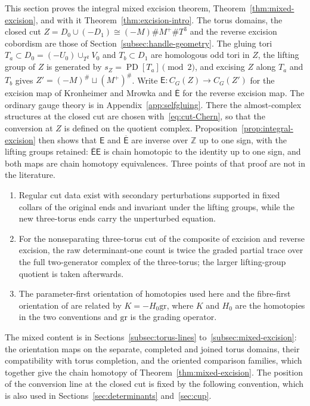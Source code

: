 \documentclass[11pt]{amsart}
\theoremstyle{definition}
\theoremstyle{remark}
\theoremstyle{plain}
\numberwithin{equation}{section}
\newcommand{\ZZ}{\mathbb Z}
\newcommand{\eps}{\mathrm{gr}}
\newcommand{\PD}{\operatorname{PD}}
\begin{document}
This section proves the integral mixed excision theorem,
Theorem~\ref{thm:mixed-excision}, and with it
Theorem~\ref{thm:excision-intro}. The torus domains, the closed cut
$Z=D_0\cup(-D_1)\cong(-M)\#M^+\#T^3$ and the reverse excision cobordism
are those of Section~\ref{subsec:handle-geometry}. The gluing tori $T_a\subset D_0=(-U_0)\cup_{T^2}V_0$ and $T_b\subset D_1$ are homologous odd tori in $Z$, the lifting group of $Z$ is generated
by $s_Z=\PD[T_a]\pmod2$, and excising $Z$ along $T_a$ and $T_b$ gives
$Z'=(-M)^\#\sqcup(M^+)^\#$. Write
$\mathsf E:C_G(Z)\to C_G(Z')$ for the excision map of Kronheimer and
Mrowka and $\overline{\mathsf E}$ for the reverse excision map. The
ordinary gauge theory is in Appendix~\ref{app:selfgluing}. There the
almost-complex structures at the closed cut are chosen
with~\eqref{eq:cut-Chern}, so that the conversion at $Z$ is defined on the
quotient complex. Proposition~\ref{prop:integral-excision} then shows that
$\mathsf E$ and $\overline{\mathsf E}$ are inverse over $\ZZ$ up to one
sign, with the lifting groups retained: $\overline{\mathsf E}\mathsf E$ is
chain homotopic to the identity up to one sign, and both maps are chain
homotopy equivalences. Three points of that proof are not in the
literature.
\begin{enumerate}[label=(\roman*)]
\item Regular cut data exist with secondary perturbations supported in
fixed collars of the original ends and invariant under the lifting
groups, while the new three-torus ends carry the unperturbed equation.
\item For the nonseparating three-torus cut of the composite of excision
and reverse excision, the raw determinant-one count is twice the graded
partial trace over the full two-generator complex of the three-torus; the
larger lifting-group quotient is taken afterwards.
\item The parameter-first orientation of homotopies used here and the
fibre-first orientation of \cite[Section~3.9]{KM-unknot} are related by $K=-H_0\eps$, where $K$ and $H_0$ are the homotopies in the two conventions and $\eps$ is the
grading operator.
\end{enumerate}
The mixed content is in Sections~\ref{subsec:torus-lines}
to~\ref{subsec:mixed-excision}: the orientation maps on the separate,
completed and joined torus domains, their compatibility with torus
completion, and the oriented comparison families, which together give the
chain homotopy of Theorem~\ref{thm:mixed-excision}. The position of the
conversion line at the closed cut is fixed by the following convention,
which is also used in Sections~\ref{sec:determinants} and~\ref{sec:cup}.
\end{document}
